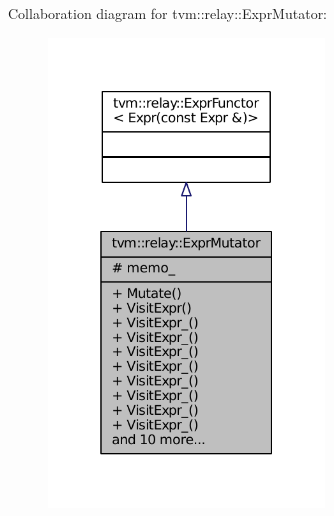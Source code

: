 Collaboration diagram for tvm\+:\+:relay\+:\+:Expr\+Mutator\+:
\nopagebreak
\begin{figure}[H]
\begin{center}
\leavevmode
\includegraphics[width=208pt]{classtvm_1_1relay_1_1ExprMutator__coll__graph}
\end{center}
\end{figure}
